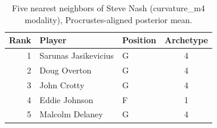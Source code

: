 \begin{table}[htbp]
  \centering\small
  \begin{tabular}{rllc}
    \toprule
    Rank & Player & Position & Archetype \\
    \midrule
    1 & Sarunas Jasikevicius & G & 4 \\
    2 & Doug Overton & G & 4 \\
    3 & John Crotty & G & 4 \\
    4 & Eddie Johnson & F & 1 \\
    5 & Malcolm Delaney & G & 4 \\
    \bottomrule
  \end{tabular}
  \caption{Five nearest neighbors of Steve Nash (curvature_m4 modality), Procrustes-aligned posterior mean.}
  \label{tab:Steve_Nash_neighbors_curvature_m4}
\end{table}


